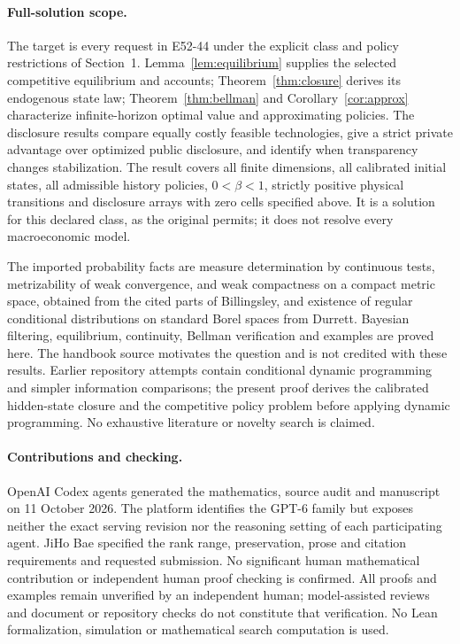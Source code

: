 \documentclass[11pt,a4paper]{article}
\begin{document}
\paragraph{Full-solution scope.}
The target is every request in E52-44 under the explicit class and policy
restrictions of Section~1. Lemma~\ref{lem:equilibrium} supplies the selected
competitive equilibrium and accounts; Theorem~\ref{thm:closure} derives its
endogenous state law; Theorem~\ref{thm:bellman} and
Corollary~\ref{cor:approx} characterize infinite-horizon optimal value and
approximating policies. The disclosure results compare equally costly feasible
technologies, give a strict private advantage over optimized public disclosure,
and identify when transparency changes stabilization. The result covers all
finite dimensions, all calibrated initial states, all admissible history
policies, $0<\beta<1$, strictly positive physical transitions and disclosure
arrays with zero cells specified above. It is a solution for this declared
class, as the original permits; it does not resolve every macroeconomic model.

The imported probability facts are measure determination by continuous tests,
metrizability of weak convergence, and weak compactness on a compact metric
space, obtained from the cited parts of Billingsley, and existence of regular
conditional distributions on standard Borel spaces from Durrett. Bayesian
filtering, equilibrium, continuity, Bellman
verification and examples are proved here. The handbook source motivates the
question and is not credited with these results. Earlier repository attempts
contain conditional dynamic programming and simpler information comparisons;
the present proof derives the calibrated hidden-state closure and the
competitive policy problem before applying dynamic programming. No exhaustive
literature or novelty search is claimed.

\paragraph{Contributions and checking.}
OpenAI Codex agents generated the mathematics, source audit and manuscript on
11 October 2026. The platform identifies the GPT-6 family but exposes neither
the exact serving revision nor the reasoning setting of each participating
agent. JiHo Bae specified the rank range, preservation, prose and citation
requirements and requested submission. No significant human mathematical
contribution or independent human proof checking is confirmed. All proofs and
examples remain unverified by an independent human; model-assisted reviews and
document or repository checks do not constitute that verification. No Lean
formalization, simulation or mathematical search computation is used.
\end{document}
